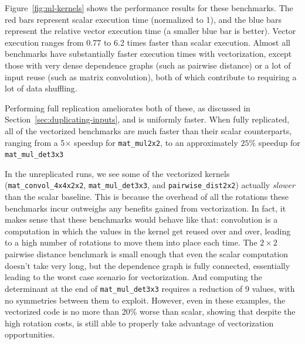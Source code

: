 Figure~\ref{fig:ml-kernels} shows the performance results for these benchmarks.
The red bars represent scalar execution time (normalized to 1), and the blue bars represent the relative vector execution time (a smaller blue bar is better).
Vector execution ranges from 0.77 to 6.2 times faster than scalar execution.
Almost all benchmarks have substantially faster execution times with vectorization, except those with very dense dependence graphs (such as pairwise distance) or a lot of input reuse (such as matrix convolution), both of which contribute to requiring a lot of data shuffling.


Performing full replication ameliorates both of these, as discussed in Section~\ref{sec:duplicating-inputs}, and is uniformly faster.
When fully replicated, all of the vectorized benchmarks are much faster than their scalar counterparts, ranging from a 5$\times$ speedup for \texttt{mat\_mul2x2}, to an approximately $25\%$ speedup for \texttt{mat\_mul\_det3x3}

In the unreplicated runs, we see some of the vectorized kernels (\texttt{mat\_convol\_4x4x2x2}, \texttt{mat\_mul\_det3x3}, and \texttt{pairwise\_dist2x2}) actually {\em slower} than the scalar baseline.
This is because the overhead of all the rotations these benchmarks incur outweighs any benefits gained from vectorization.
In fact, it makes sense that these benchmarks would behave like that: convolution is a computation in which the values in the kernel get reused over and over, leading to a high number of rotations to move them into place each time.
The $2\times 2$ pairwise distance benchmark is small enough that even the scalar computation doesn't take very long, but the dependence graph is fully connected, essentially leading to the worst case scenario for vectorization.
And computing the determinant at the end of \texttt{mat\_mul\_det3x3} requires a reduction of 9 values, with no symmetries between them to exploit.
However, even in these examples, the vectorized code is no more than 20\% worse than scalar, showing that despite the high rotation costs, \system is still able to properly take advantage of vectorization opportunities.

